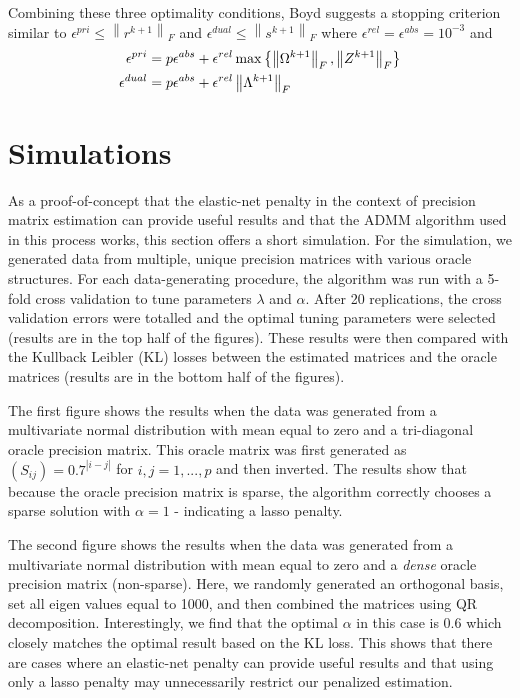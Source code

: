 \documentclass[11pt,]{report}
\theoremstyle{definition}
\theoremstyle{definition}
\theoremstyle{definition}
\theoremstyle{remark}
\begin{document}
Combining these three optimality conditions, Boyd suggests a stopping criterion similar to \(\epsilon^{pri} \leq \left\| r^{k + 1} \right\|_{F}\) and \(\epsilon^{dual} \leq \left\| s^{k + 1} \right\|_{F}\) where \(\epsilon^{rel} = \epsilon^{abs} = 10^{-3}\) and
\begin{equation}
\begin{split}
  \epsilon^{pri} &= p\epsilon^{abs} + \epsilon^{rel}\max\left\{ \left\| \Omega^{k + 1} \right\|_{F}, \left\| Z^{k + 1} \right\|_{F} \right\} \\
  \epsilon^{dual} &= p\epsilon^{abs} + \epsilon^{rel}\left\| \Lambda^{k + 1} \right\|_{F}
\label{eq:admmstopping}\notag
\end{split}
\end{equation}

\hypertarget{simulations}{%
\section{Simulations}\label{simulations}}

As a proof-of-concept that the elastic-net penalty in the context of precision matrix estimation can provide useful results and that the ADMM algorithm used in this process works, this section offers a short simulation. For the simulation, we generated data from multiple, unique precision matrices with various oracle structures. For each data-generating procedure, the algorithm was run with a 5-fold cross validation to tune parameters \(\lambda\) and \(\alpha\). After 20 replications, the cross validation errors were totalled and the optimal tuning parameters were selected (results are in the top half of the figures). These results were then compared with the Kullback Leibler (KL) losses between the estimated matrices and the oracle matrices (results are in the bottom half of the figures).

The first figure shows the results when the data was generated from a multivariate normal distribution with mean equal to zero and a tri-diagonal oracle precision matrix. This oracle matrix was first generated as \(\left(S_{ij}\right) = 0.7^{\left|i - j \right|}\) for \(i,j = 1,..., p\) and then inverted. The results show that because the oracle precision matrix is sparse, the algorithm correctly chooses a sparse solution with \(\alpha = 1\) - indicating a lasso penalty.

The second figure shows the results when the data was generated from a multivariate normal distribution with mean equal to zero and a \emph{dense} oracle precision matrix (non-sparse). Here, we randomly generated an orthogonal basis, set all eigen values equal to 1000, and then combined the matrices using QR decomposition. Interestingly, we find that the optimal \(\alpha\) in this case is 0.6 which closely matches the optimal result based on the KL loss. This shows that there are cases where an elastic-net penalty can provide useful results and that using only a lasso penalty may unnecessarily restrict our penalized estimation.
\end{document}
